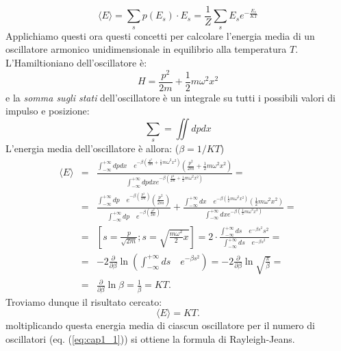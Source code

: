 \documentclass[a4paper,12pt,oneside]{book}
\begin{document}
\begin{equation}
\langle E \rangle = \sum _s p(E_s)\cdot E_s = \frac{1}{Z}\sum _s E_s e^{-\frac{E_s}{KT}}
\end{equation}
Applichiamo questi ora questi concetti per calcolare l'energia media di un oscillatore armonico unidimensionale in equilibrio alla temperatura $T$. L'Hamiltioniano dell'oscillatore è:
\begin{equation}
H= \frac{p^2}{2m}+\frac{1}{2}m \omega ^2 x^2
\end{equation}
e la \textit{somma sugli stati} dell'oscillatore è un integrale su tutti i possibili valori di impulso e posizione:
\begin{equation}
\sum _s = \iint dp dx
\end{equation}
L'energia media dell'oscillatore è allora: ($\beta = 1/KT$)
\begin{eqnarray}
\langle E \rangle &=& \frac{\int _{-\infty} ^{+\infty} dp dx \quad e^{-\beta \left( \frac{p^2}{2m}+\frac{1}{2}m \omega ^2x^2\right)}\left( \frac{p^2}{2m}+\frac{1}{2}m \omega ^2x^2\right)}{\int _{-\infty} ^{+\infty} dp dx e^{-\beta \left( \frac{p^2}{2m}+\frac{1}{2}m \omega ^2x^2\right)}}= \nonumber \\
&=&\frac{\int _{-\infty} ^{+\infty} dp \quad e^{-\beta \left( \frac{p^2}{2m}\right)}\left( \frac{p^2}{2m}\right)}{\int _{-\infty} ^{+\infty} dp \quad e^{-\beta \left( \frac{p^2}{2m}\right)}} + \frac{\int _{-\infty} ^{+\infty}  dx \quad e^{-\beta \left(\frac{1}{2}m \omega ^2x^2\right)}\left(\frac{1}{2}m \omega ^2x^2\right)}{\int _{-\infty} ^{+\infty} dx e^{-\beta \left( \frac{1}{2}m \omega ^2x^2\right)}}= \nonumber \\
&=& \left[ s=\frac{p}{\sqrt{2m}}; s= \sqrt{\frac{m \omega ^2}{2}x} \right]= 2\cdot \frac{\int _{-\infty} ^{+\infty}ds \quad e^{-\beta s^2}s^2}{\int _{-\infty} ^{+\infty}ds \quad e^{-\beta s^2}}= \nonumber \\
&=&-2 \frac{\partial}{\partial \beta} \ln \left(\int _{-\infty} ^{+\infty}ds \quad e^{-\beta s^2} \right) = -2\frac{\partial}{\partial \beta} \ln \sqrt{\frac{\pi}{\beta}}= \nonumber \\
&=& \frac{\partial}{\partial \beta} \ln \beta = \frac{1}{\beta}= KT. 
\end{eqnarray}
Troviamo dunque il risultato cercato:
\begin{equation}
\langle E \rangle = KT.
\label{eq:cap1_2}
\end{equation}
moltiplicando questa energia media di ciascun oscillatore per il numero di oscillatori (eq. (\ref{eq:cap1_1})) si ottiene la formula di Rayleigh-Jeans.\\
\end{document}
